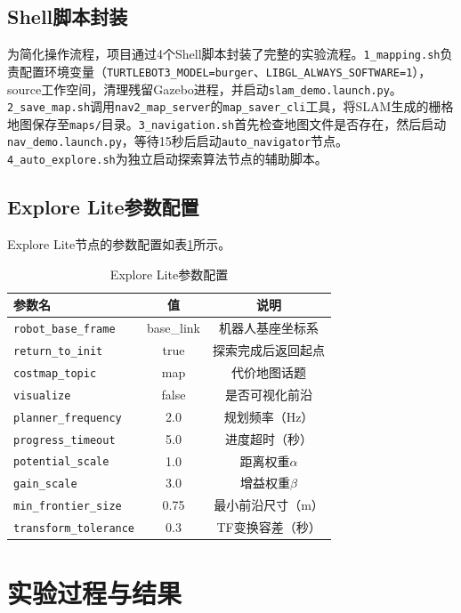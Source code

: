 \documentclass[a4paper,12pt]{article}
\begin{document}
\subsection{Shell脚本封装}

为简化操作流程，项目通过4个Shell脚本封装了完整的实验流程。\texttt{1\_mapping.sh}负责配置环境变量（\texttt{TURTLEBOT3\_MODEL=burger}、\texttt{LIBGL\_ALWAYS\_SOFTWARE=1}），source工作空间，清理残留Gazebo进程，并启动\texttt{slam\_demo.launch.py}。\texttt{2\_save\_map.sh}调用\texttt{nav2\_map\_server}的\texttt{map\_saver\_cli}工具，将SLAM生成的栅格地图保存至\texttt{maps/}目录。\texttt{3\_navigation.sh}首先检查地图文件是否存在，然后启动\texttt{nav\_demo.launch.py}，等待15秒后启动\texttt{auto\_navigator}节点。\texttt{4\_auto\_explore.sh}为独立启动探索算法节点的辅助脚本。

\subsection{Explore Lite参数配置}

Explore Lite节点的参数配置如表\ref{tab:explore_params}所示。

\begin{table}[H]
\centering
\caption{Explore Lite参数配置}
\label{tab:explore_params}
\begin{tabular}{lcc}
\toprule
参数名 & 值 & 说明 \\
\midrule
\texttt{robot\_base\_frame} & base\_link & 机器人基座坐标系 \\
\texttt{return\_to\_init} & true & 探索完成后返回起点 \\
\texttt{costmap\_topic} & map & 代价地图话题 \\
\texttt{visualize} & false & 是否可视化前沿 \\
\texttt{planner\_frequency} & 2.0 & 规划频率（Hz） \\
\texttt{progress\_timeout} & 5.0 & 进度超时（秒） \\
\texttt{potential\_scale} & 1.0 & 距离权重$\alpha$ \\
\texttt{gain\_scale} & 3.0 & 增益权重$\beta$ \\
\texttt{min\_frontier\_size} & 0.75 & 最小前沿尺寸（m） \\
\texttt{transform\_tolerance} & 0.3 & TF变换容差（秒） \\
\bottomrule
\end{tabular}
\end{table}

\section{实验过程与结果}
\end{document}
